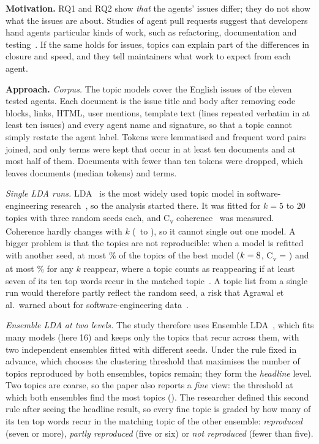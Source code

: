 \label{sec:rq3}
\textbf{Motivation.} RQ1 and RQ2 show \emph{that} the agents' issues differ; they do not show what the issues are about. Studies of agent pull requests suggest that developers hand agents particular kinds of work, such as refactoring, documentation and testing~\cite{watanabe2025agentic}. If the same holds for issues, topics can explain part of the differences in closure and speed, and they tell maintainers what work to expect from each agent.

\textbf{Approach.} \emph{Corpus.} The topic models cover the \NEnglishTested{} English issues of the eleven tested agents. Each document is the issue title and body after removing code blocks, links, HTML, user mentions, template text (lines repeated verbatim in at least ten issues) and every agent name and signature, so that a topic cannot simply restate the agent label. Tokens were lemmatised and frequent word pairs joined, and only terms were kept that occur in at least ten documents and at most half of them. Documents with fewer than ten tokens were dropped, which leaves \NDocsRQThree{} documents (median \MedTokens{} tokens) and \NVocab{} terms.

\emph{Single LDA runs.} LDA~\cite{blei2003lda} is the most widely used topic model in software-engineering research~\cite{chen2016survey,silva2021topic}, so the analysis started there. It was fitted for \(k = 5\) to 20 topics with three random seeds each, and C\textsubscript{v} coherence~\cite{roder2015coherence} was measured. Coherence hardly changes with \(k\) (\CvMin\ to \CvMax), so it cannot single out one model. A bigger problem is that the topics are not reproducible: when a model is refitted with another seed, at most \SelRepro\% of the topics of the best model (\(k = 8\), C\textsubscript{v} = \SelCv) and at most \SingleReproMax\% for any \(k\) reappear, where a topic counts as reappearing if at least seven of its ten top words recur in the matched topic~\cite{greene2014stability}. A topic list from a single run would therefore partly reflect the random seed, a risk that Agrawal et al.\ warned about for software-engineering data~\cite{agrawal2018wrong}.

\emph{Ensemble LDA at two levels.} The study therefore uses Ensemble LDA~\cite{brigl2019ensemble}, which fits many models (here 16) and keeps only the topics that recur across them, with two independent ensembles fitted with different seeds. Under the rule fixed in advance, which chooses the clustering threshold that maximises the number of topics reproduced by both ensembles, \NTopicsH{} topics remain; they form the \emph{headline} level. Two topics are coarse, so the paper also reports a \emph{fine} view: the threshold at which both ensembles find the most topics (\NTopicsF). The researcher defined this second rule after seeing the headline result, so every fine topic is graded by how many of its ten top words recur in the matching topic of the other ensemble: \emph{reproduced} (seven or more), \emph{partly reproduced} (five or six) or \emph{not reproduced} (fewer than five).

